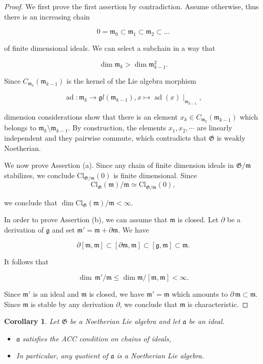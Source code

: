 \documentclass[11pt, letterpaper, reqno]{amsart}
\newtheorem{cor}[theorem]{Corollary}
\theoremstyle{definition}
\newcommand{\ad}{\operatorname{ad}}
\newcommand{\fgl}{\mathfrak gl}
\newcommand{\fa}{\mathfrak{a}}
\newcommand{\fg}{\mathfrak{g}}
\newcommand{\fm}{\mathfrak{m}}
\newcommand{\fG}{\mathfrak{G}}
\newcommand{\Cl}{\mathrm{Cl}}
\begin{document}
\begin{proof} We first prove the first assertion
by contradiction. Assume otherwise, thus there 
is  an increasing chain

$$0=\fm_0\subset \fm_1\subset\fm_2\subset\ldots$$

\noindent of finite dimensional ideals. We can 
select a subchain in a way that

$$\dim \fm_{k}>\dim \fm_{k-1}^2.$$

Since $C_{\fm_{k}}(\fm_{k-1})$ is the kernel of the Lie algebra morphism

$$\ad:\fm_{k}\to \fgl(\fm_{k-1}), 
x\mapsto \ad(x)\mid_{\fm_{k-1}},$$

\noindent  dimension considerations show that there is an element
$x_k\in C_{\fm_{k}}(\fm_{k-1})$ which 
belongs to $\fm_{k}\setminus \fm_{k-1}$.
By construction, the elements $x_1,x_2,\cdots$
are linearly independent and they pairwise commute, which contradicts that $\fG$ is weakly Noetherian.

We now prove Assertion (a). Since any chain
of finite dimension ideals in $\fG/\fm$ stabilizes,
we conclude $\Cl_{\fG/\fm}(0)$ is finite dimensional.
Since 
$$\Cl_{\fG}(\fm)/\fm\simeq\Cl_{\fG/\fm}(0),$$ 

\noindent we conclude that  $\dim \Cl_{\fG}(\fm)/\fm<\infty.$




In order to prove Assertion (b), we can assume that
$\fm$ is closed. Let
$\partial$ be a derivation of $\fg$
and set $\fm'=\fm+\partial\fm$.
We have 

$$\partial[\fm,\fm]\subset 
[\partial\fm,\fm]\subset [\fg,\fm]\subset\fm.$$

\noindent It follows that 

$$\dim\,\fm'/\fm\leq \dim \fm/[\fm,\fm]<\infty.$$

\noindent Since $\fm'$ is an ideal and $\fm$ is closed, we have 
$\fm'=\fm$ which amounts to
$\partial\,\fm\subset\fm$. Since $\fm$ is stable by any derivation $\partial$, we conclude that
$\fm$ is characteristic.
\end{proof}

\begin{cor}\label{idealACC} Let $\fG$ be a Noetherian Lie algebra and let $\fa$ be an ideal.
\begin{itemize}
\item[(a)]  $\fa$  satisfies the ACC condition on chains of ideals,
\item[(b)] In particular, any quotient of $\fa$ is a Noetherian Lie algebra.
\end{itemize}
\end{cor}
\end{document}
